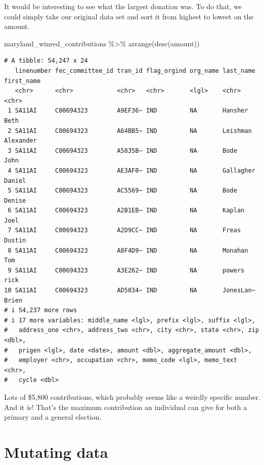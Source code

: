 \documentclass[
  letterpaper,
  DIV=11,
  numbers=noendperiod]{scrreprt}
\newenvironment{Shaded}{\begin{snugshade}}{\end{snugshade}}
\newcommand{\FunctionTok}[1]{\textcolor[rgb]{0.28,0.35,0.67}{#1}}
\newcommand{\NormalTok}[1]{\textcolor[rgb]{0.00,0.23,0.31}{#1}}
\newcommand{\SpecialCharTok}[1]{\textcolor[rgb]{0.37,0.37,0.37}{#1}}
\begin{document}
It would be interesting to see what the largest donation was. To do
that, we could simply take our original data set and sort it from
highest to lowest on the amount.

\begin{Shaded}
\begin{Highlighting}[]
\NormalTok{maryland\_winred\_contributions }\SpecialCharTok{\%\textgreater{}\%}
  \FunctionTok{arrange}\NormalTok{(}\FunctionTok{desc}\NormalTok{(amount))}
\end{Highlighting}
\end{Shaded}

\begin{verbatim}
# A tibble: 54,247 x 24
   linenumber fec_committee_id tran_id flag_orgind org_name last_name first_name
   <chr>      <chr>            <chr>   <chr>       <lgl>    <chr>     <chr>     
 1 SA11AI     C00694323        A9EF36~ IND         NA       Hansher   Beth      
 2 SA11AI     C00694323        A64BB5~ IND         NA       Leishman  Alexander 
 3 SA11AI     C00694323        A5835B~ IND         NA       Bode      John      
 4 SA11AI     C00694323        AE3AF0~ IND         NA       Gallagher Daniel    
 5 SA11AI     C00694323        AC5569~ IND         NA       Bode      Denise    
 6 SA11AI     C00694323        A2B1EB~ IND         NA       Kaplan    Joel      
 7 SA11AI     C00694323        A2D9CC~ IND         NA       Freas     Dustin    
 8 SA11AI     C00694323        A8F4D9~ IND         NA       Monahan   Tom       
 9 SA11AI     C00694323        A3E262~ IND         NA       powers    rick      
10 SA11AI     C00694323        AD5034~ IND         NA       JonesLan~ Brien     
# i 54,237 more rows
# i 17 more variables: middle_name <lgl>, prefix <lgl>, suffix <lgl>,
#   address_one <chr>, address_two <chr>, city <chr>, state <chr>, zip <dbl>,
#   prigen <lgl>, date <date>, amount <dbl>, aggregate_amount <dbl>,
#   employer <chr>, occupation <chr>, memo_code <lgl>, memo_text <chr>,
#   cycle <dbl>
\end{verbatim}

Lots of \$5,800 contributions, which probably seems like a weirdly
specific number. And it is! That's the maximum contribution an
individual can give for both a primary and a general election.


\hypertarget{mutating-data}{%
\chapter{Mutating data}\label{mutating-data}}
\end{document}
